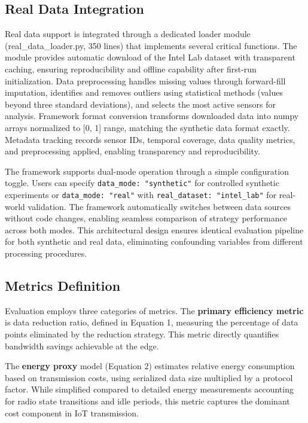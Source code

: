\documentclass[10pt,twocolumn]{article}
\begin{document}
\vspace{0.15cm}

\subsection{Real Data Integration}

Real data support is integrated through a dedicated loader module (real\_data\_loader.py, 350 lines) that implements several critical functions. The module provides automatic download of the Intel Lab dataset with transparent caching, ensuring reproducibility and offline capability after first-run initialization. Data preprocessing handles missing values through forward-fill imputation, identifies and removes outliers using statistical methods (values beyond three standard deviations), and selects the most active sensors for analysis. Framework format conversion transforms downloaded data into numpy arrays normalized to [0, 1] range, matching the synthetic data format exactly. Metadata tracking records sensor IDs, temporal coverage, data quality metrics, and preprocessing applied, enabling transparency and reproducibility.

The framework supports dual-mode operation through a simple configuration toggle. Users can specify \texttt{data\_mode: "synthetic"} for controlled synthetic experiments or \texttt{data\_mode: "real"} with \texttt{real\_dataset: "intel\_lab"} for real-world validation. The framework automatically switches between data sources without code changes, enabling seamless comparison of strategy performance across both modes. This architectural design ensures identical evaluation pipeline for both synthetic and real data, eliminating confounding variables from different processing procedures.

\vspace{0.15cm}

\subsection{Metrics Definition}

Evaluation employs three categories of metrics. The \textbf{primary efficiency metric} is data reduction ratio, defined in Equation 1, measuring the percentage of data points eliminated by the reduction strategy. This metric directly quantifies bandwidth savings achievable at the edge.

The \textbf{energy proxy} model (Equation 2) estimates relative energy consumption based on transmission costs, using serialized data size multiplied by a protocol factor. While simplified compared to detailed energy measurements accounting for radio state transitions and idle periods, this metric captures the dominant cost component in IoT transmission.
\end{document}
